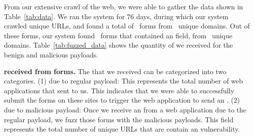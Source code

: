 From our extensive crawl of the web, we were able to gather the data
shown in Table~\ref{tab:data}. We ran the system for 76 days, during which our system crawled \urls unique URLs,
and found a total of \forms\ forms from \uniqueforms\ unique domains. Out of these forms, our system
found \emailforms\ forms that contained an \email field, from \uniqueemailforms\ unique domains.
Table~\ref{tab:fuzzed_data} shows the quantity of \emails we received for the benign and malicious payloads. 



\noindent\textbf{\Email received from forms.} The \emails that we
received can be categorized into two categories. (1) \Emails due to
regular payload: This represents the total number of web applications
that sent \emails to us. This indicates that we were able to
successfully submit the forms on these sites to trigger the web
application to send an \email. (2) \Emails due to malicious payload:
Once we receive an \email from a web application due to the regular
payload, we fuzz those forms with the malicious payloads. This field
represents the total number of unique URLs that are contain an \ehi
vulnerability.

